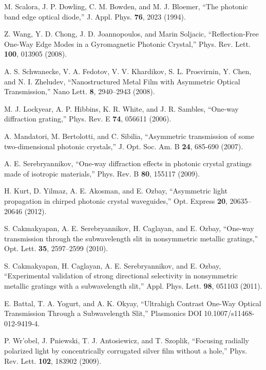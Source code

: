 \documentclass[10pt,letterpaper,twocolumn]{article} %
\begin{document}
\newpage
\begin{thebibliography}{10}
\newcommand{\enquote}[1]{``#1''}

M. Scalora, J. P. Dowling, C. M. Bowden, and M. J. Bloemer, 
``The photonic band edge optical diode,'' 
J. Appl. Phys. \textbf{76}, 2023 (1994).

Z. Wang, Y. D. Chong, J. D. Joannopoulos, and Marin Soljacic, 
``Reflection-Free One-Way Edge Modes in a Gyromagnetic Photonic Crystal,''
Phys. Rev. Lett. \textbf{100}, 013905 (2008).

A. S. Schwanecke, V. A. Fedotov, V. V. Khardikov, S. L. Prosvirnin, Y. Chen, and N. I. Zheludev,
``Nanostructured Metal Film with Asymmetric Optical Transmission,''
Nano Lett. \textbf{8},  2940--2943 (2008).

M. J. Lockyear, A. P. Hibbins, K. R. White, and J. R. Sambles,
``One-way diffraction grating,''
Phys. Rev. E \textbf{74}, 056611 (2006).

A. Mandatori, M. Bertolotti, and C. Sibilia, 
``Asymmetric transmission of some two-dimensional photonic crystals,''
J. Opt. Soc. Am. B \textbf{24}, 685-690 (2007).

A. E. Serebryannikov, 
``One-way diffraction effects in photonic crystal gratings made of isotropic materials,'' 
Phys. Rev. B \textbf{80}, 155117 (2009).

H. Kurt, D. Yilmaz, A. E. Akosman, and E. Ozbay, 
``Asymmetric light propagation in chirped photonic crystal waveguides,'' 
Opt. Express \textbf{20}, 20635--20646 (2012). 

S. Cakmakyapan, A. E. Serebryannikov, H. Caglayan, and E. Ozbay, 
``One-way transmission through the subwavelength slit in nonsymmetric metallic gratings,''
Opt. Lett. \textbf{35}, 2597--2599 (2010). 

S. Cakmakyapan, H. Caglayan, A. E. Serebryannikov, and E. Ozbay,
``Experimental validation of strong directional selectivity in nonsymmetric metallic gratings with a subwavelength slit,''
Appl. Phys. Lett. \textbf{98}, 051103 (2011).

E. Battal, T. A. Yogurt, and A. K. Okyay,
``Ultrahigh Contrast One-Way Optical Transmission Through a Subwavelength Slit,''
Plasmonics DOI 10.1007/s11468-012-9419-4.

P. Wr\a'{o}bel, J. Pniewski, T. J. Antosiewicz, and T. Szoplik,
``Focusing radially polarized light by concentrically corrugated silver film without a hole,''
Phys. Rev. Lett. \textbf{102}, 183902 (2009).


\end{thebibliography}
\end{document}
